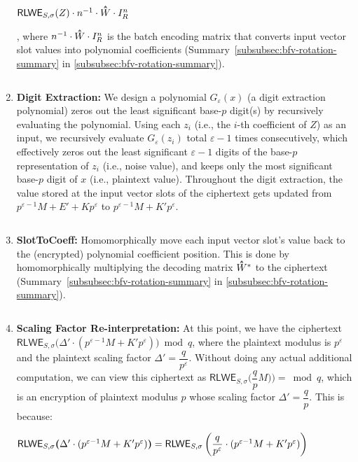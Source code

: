 \begin{enumerate}
$\textsf{RLWE}_{S, \sigma}(Z) \cdot n^{-1}\cdot \hathat{W}\cdot I_R^n$

, where $n^{-1}\cdot \hathat{W}\cdot I_R^n$ is the batch encoding matrix that converts input vector slot values into polynomial coefficients (Summary~\ref*{subsubsec:bfv-rotation-summary} in \autoref{subsubsec:bfv-rotation-summary}). 

$ $

\item \textbf{Digit Extraction:} We design a polynomial $G_\varepsilon(x)$ (a digit extraction polynomial) zeros out the least significant base-$p$  digit(s) by recursively evaluating the polynomial. Using each $z_i$ (i.e., the $i$-th coefficient of $Z$) as an input, we recursively evaluate $G_\varepsilon(z_i)$ total $\varepsilon-1$ times consecutively, which effectively zeros out the least significant $\varepsilon-1$ digits of the base-$p$ representation of $z_i$ (i.e., noise value), and keeps only the most significant base-$p$ digit of $x$ (i.e., plaintext value). Throughout the digit extraction, the value stored at the input vector slots of the ciphertext gets updated from $p^{\varepsilon-1} M  + E' + Kp^\varepsilon$ to $p^{\varepsilon-1}M  + K'p^\varepsilon$. 


$ $


\item \textbf{\textsf{SlotToCoeff}:} Homomorphically move each input vector slot's value back to the (encrypted) polynomial coefficient position. This is done by homomorphically multiplying the decoding matrix $\hathat{W}^*$ to the ciphertext (Summary~\ref*{subsubsec:bfv-rotation-summary} in \autoref{subsubsec:bfv-rotation-summary}).


$ $


\item \textbf{Scaling Factor Re-interpretation:} At this point, we have the ciphertext $\textsf{RLWE}_{S, \sigma}\bm(\Delta' \cdot (p^{\varepsilon-1}M + K'p^\varepsilon)\bm) \bmod q$, where the plaintext modulus is $p^\varepsilon$ and the plaintext scaling factor $\Delta' = \dfrac{q}{p^\varepsilon}$. Without doing any actual additional computation, we can view this ciphertext as $\textsf{RLWE}_{S, \sigma}\bm(\dfrac{q}{p}M)\bm) = \bmod q$, which is an encryption of plaintext modulus $p$ whose scaling factor $\Delta' = \dfrac{q}{p}$. This is because:

$\textsf{RLWE}_{S, \sigma}\bm(\Delta' \cdot (p^{\varepsilon-1}M + K'p^\varepsilon) \bm) = \textsf{RLWE}_{S, \sigma}\bm\left(\dfrac{q}{p^\varepsilon} \cdot (p^{\varepsilon-1}M + K'p^\varepsilon) \bm\right)$


\end{enumerate}
